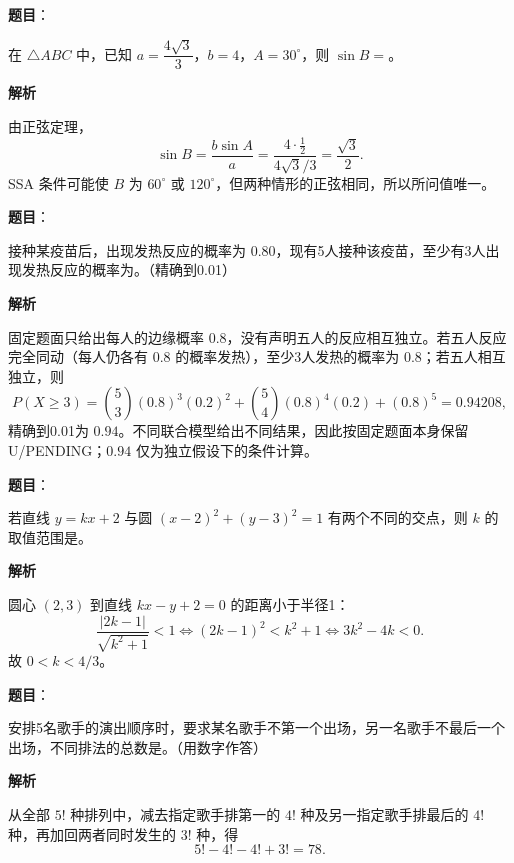 \begin{answer}

\textbf{题目}：

在 $\triangle ABC$ 中，已知 $a=\dfrac{4\sqrt3}{3}$，$b=4$，$A=30^\circ$，则 $\sin B=$\gkblank{}。

\textbf{解析}

由正弦定理，
\nopagebreak[4]
\[
\sin B=\frac{b\sin A}{a}
=\frac{4\cdot\frac12}{4\sqrt3/3}
=\frac{\sqrt3}{2}.
\]
SSA 条件可能使 $B$ 为 $60^\circ$ 或 $120^\circ$，但两种情形的正弦相同，所以所问值唯一。


\end{answer}
\begin{answer}

\textbf{题目}：

接种某疫苗后，出现发热反应的概率为 $0.80$，现有5人接种该疫苗，至少有3人出现发热反应的概率为\gkblank{}。（精确到0.01）

\textbf{解析}

固定题面只给出每人的边缘概率 $0.8$，没有声明五人的反应相互独立。若五人反应完全同动（每人仍各有 $0.8$ 的概率发热），至少3人发热的概率为 $0.8$；若五人相互独立，则
\nopagebreak[4]
\[
P(X\geqslant3)=\binom53(0.8)^3(0.2)^2+\binom54(0.8)^4(0.2)+(0.8)^5=0.94208,
\]
精确到0.01为 $0.94$。不同联合模型给出不同结果，因此按固定题面本身保留 U/PENDING；$0.94$ 仅为独立假设下的条件计算。


\end{answer}
\begin{answer}

\textbf{题目}：

若直线 $y=kx+2$ 与圆 $(x-2)^2+(y-3)^2=1$ 有两个不同的交点，则 $k$ 的取值范围是\gkblank{}。

\textbf{解析}

圆心 $(2,3)$ 到直线 $kx-y+2=0$ 的距离小于半径1：
\nopagebreak[4]
\[
\frac{|2k-1|}{\sqrt{k^2+1}}<1
\iff (2k-1)^2<k^2+1
\iff 3k^2-4k<0.
\]
故 $0<k<4/3$。


\end{answer}
\begin{answer}

\textbf{题目}：

安排5名歌手的演出顺序时，要求某名歌手不第一个出场，另一名歌手不最后一个出场，不同排法的总数是\gkblank{}。（用数字作答）

\textbf{解析}

从全部 $5!$ 种排列中，减去指定歌手排第一的 $4!$ 种及另一指定歌手排最后的 $4!$ 种，再加回两者同时发生的 $3!$ 种，得
\nopagebreak[4]
\[
5!-4!-4!+3!=78.
\]


\end{answer}
